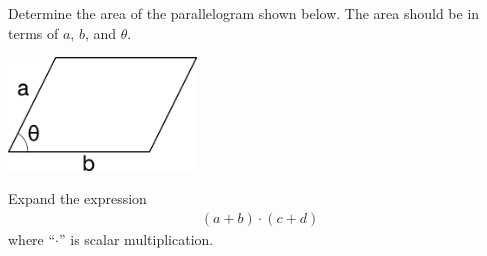 \begin{problem}
\item Determine the area of the parallelogram shown below. The area
  should be in terms of $a$, $b$, and $\theta$.

  \includegraphics[width=5cm]{../semI/ink/week11/parallelogram}

  \vfill

\item Expand the expression
  \begin{eqnarray*}
    \left( a + b \right) \cdot \left( c + d \right)
  \end{eqnarray*}
  where ``$\cdot$'' is scalar multiplication.

  \vfill

\end{problem}


